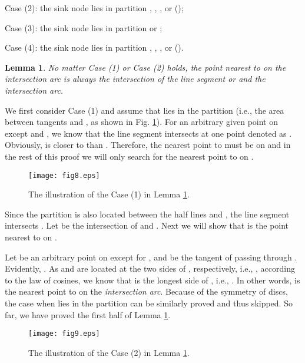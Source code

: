 \documentclass[journal]{IEEEtran}
\newtheorem{lemma}{Lemma}
\begin{document}
Case (2): the sink node  lies in partition , , , or  ();

Case (3): the sink node  lies in partition  or ;

Case (4): the sink node  lies in partition , , , or  ().

\begin{lemma}\label{lemma3}
No matter Case (1) or Case (2) holds, the point nearest to  on the \emph{intersection arc} is always the intersection of the line segment  or  and the \emph{intersection arc}.
\end{lemma}
\begin{IEEEproof}
We first consider Case (1) and assume that  lies in the partition  (i.e., the area between tangents  and , as shown in Fig. \ref{fig8}).
For an arbitrary given point  on  except  and , we know that the line segment  intersects  at one
point denoted as . Obviously,  is closer to  than . Therefore, the nearest point to  must be on  and in the
rest of this proof we will only search for the nearest point to  on .

\begin{figure}
\begin{center}
\texttt{[image: fig8.eps]}    \caption{The illustration of the Case (1) in Lemma \ref{lemma3}.}
\label{fig8}                                 \end{center}                                 \end{figure}

Since the partition  is also located between the half lines  and , the line segment  intersects . Let  be the intersection
of  and . Next we will show that  is the point nearest to  on .

Let  be an arbitrary point on  except for , and  be the tangent of  passing through . Evidently, .
As  and  are located at the two sides of , respectively, i.e., , according to the law of cosines, we know that  is
the longest side of , i.e., . In other words,  is the nearest point to  on the \emph{intersection arc}.
Because of the symmetry of discs, the case when  lies in the partition  can be similarly proved and thus skipped. So far, we have proved the first half of Lemma \ref{lemma3}.

\begin{figure}
\begin{center}
\texttt{[image: fig9.eps]}    \caption{The illustration of the Case (2) in Lemma \ref{lemma3}.}
\label{fig9}                                 \end{center}                                 \end{figure}


\end{IEEEproof}
\end{document}
